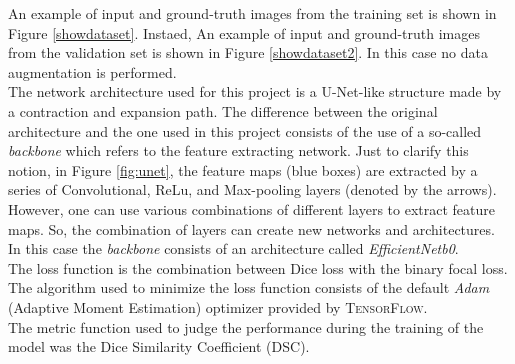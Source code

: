 \documentclass{standalone}
\begin{document}
An example of input and ground-truth images from the training set is shown in Figure \ref{showdataset}.
Instaed, An example of input and ground-truth images from the validation set is shown in Figure \ref{showdataset2}.
In this case no data augmentation is performed.
\\
The network architecture used for this project is a U-Net-like structure made by a contraction and expansion path.
The difference between the original architecture and the one used in this project consists of the use of a so-called \textit{backbone} which refers to the feature extracting network.
Just to clarify this notion, in Figure \ref{fig:unet}, the feature maps (blue boxes) are extracted by a series of Convolutional, ReLu, and Max-pooling layers (denoted by the arrows).
However, one can use various combinations of different layers to extract feature maps. 
So, the combination of layers can create new networks and architectures.
In this case the \textit{backbone} consists of an architecture called \textit{EfficientNetb0}\cite{EfficientNet}.
\\
The loss function is the combination between Dice loss with the binary focal loss.
\\
The algorithm used to minimize the loss function consists of the default \textit{Adam} (Adaptive Moment Estimation) optimizer provided by \textsc{TensorFlow}.
\\
The metric function used to judge the performance during the training of the model was the Dice Similarity Coefficient (DSC).
\end{document}

